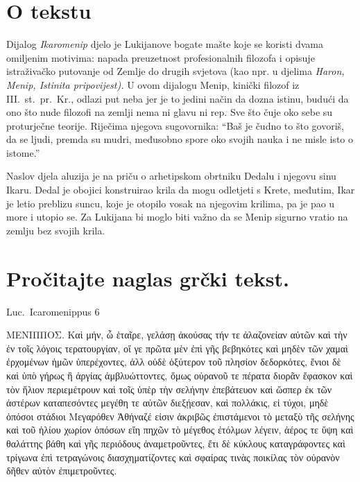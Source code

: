 


\section*{O tekstu}

Dijalog \textit{Ikaromenip} djelo je Lukijanove bogate mašte koje se koristi dvama omiljenim motivima: napada preuzetnost profesionalnih filozofa i opisuje istraživačko putovanje od Zemlje do drugih svjetova (kao npr. u djelima \textit{Haron, Menip, Istinita pripovijest).} U ovom dijalogu Menip, kinički filozof iz III.~st.\ pr.~Kr., odlazi put neba jer je to jedini način da dozna istinu, budući da ono što nude filozofi na zemlji nema ni glavu ni rep. Sve što čuje oko sebe su proturječne teorije. Riječima njegova sugovornika: ``Baš je čudno to što govoriš, da se ljudi, premda su mudri, međusobno spore oko svojih nauka i ne misle isto o istome.'' 

Naslov djela aluzija je na priču o arhetipskom obrtniku Dedalu i njegovu sinu Ikaru. Dedal je obojici konstruirao krila da mogu odletjeti s Krete, međutim, Ikar je letio preblizu suncu, koje je otopilo vosak na njegovim krilima, pa je pao u more i utopio se. Za Lukijana bi moglo biti važno da se Menip sigurno vratio na zemlju bez svojih krila.



\section*{Pročitajte naglas grčki tekst.}

Luc.\ Icaromenippus 6


\medskip


{\large

\begin{greek}

\noindent ΜΕΝΙΠΠΟΣ. Καὶ μήν, ὦ ἑταῖρε, γελάσῃ ἀκούσας τήν τε ἀλαζονείαν αὐτῶν καὶ τὴν ἐν τοῖς λόγοις τερατουργίαν, οἵ γε πρῶτα μὲν ἐπὶ γῆς βεβηκότες καὶ μηδὲν τῶν χαμαὶ ἐρχομένων ἡμῶν ὑπερέχοντες, ἀλλ οὐδὲ ὀξύτερον τοῦ πλησίον δεδορκότες, ἔνιοι δὲ καὶ ὑπὸ γήρως ἢ ἀργίας ἀμβλυώττοντες, ὅμως οὐρανοῦ τε πέρατα διορᾶν ἔφασκον καὶ τὸν ἥλιον περιεμέτρουν καὶ τοῖς ὑπὲρ τὴν σελήνην ἐπεβάτευον καὶ ὥσπερ ἐκ τῶν ἀστέρων καταπεσόντες μεγέθη τε αὐτῶν διεξῄεσαν, καὶ πολλάκις, εἰ τύχοι, μηδὲ ὁπόσοι στάδιοι Μεγαρόθεν Ἀθήναζέ εἰσιν ἀκριβῶς ἐπιστάμενοι τὸ μεταξὺ τῆς σελήνης καὶ τοῦ ἡλίου χωρίον ὁπόσων εἴη πηχῶν τὸ μέγεθος ἐτόλμων λέγειν, ἀέρος τε ὕψη καὶ θαλάττης βάθη καὶ γῆς περιόδους ἀναμετροῦντες, ἔτι δὲ κύκλους καταγράφοντες καὶ τρίγωνα ἐπὶ τετραγώνοις διασχηματίζοντες καὶ σφαίρας τινὰς ποικίλας τὸν οὐρανὸν δῆθεν αὐτὸν ἐπιμετροῦντες.

\end{greek}

}


